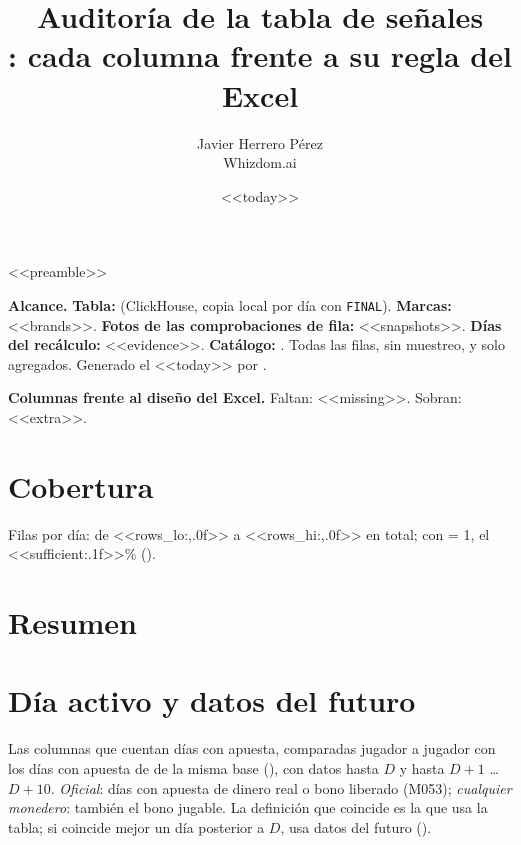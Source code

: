 <<preamble>>
\newcommand{\prioE}{\badge{BrickRed}{ERROR}}
\title{\textbf{Auditoría de la tabla de señales}\\[2pt]\large{}: cada columna frente a su regla del Excel}
\date{<<today>>}
\author{Javier Herrero Pérez \\ Whizdom.ai}


\maketitle
\vspace{-1.2cm}

\textbf{Alcance.} \textbf{Tabla:}  (ClickHouse, copia local por día con \texttt{FINAL}). \textbf{Marcas:} <<brands>>. \textbf{Fotos de las comprobaciones de fila:} <<snapshots>>. \textbf{Días del recálculo:} <<evidence>>. \textbf{Catálogo:} . Todas las filas, sin muestreo, y solo agregados. Generado el <<today>> por .

\textbf{Columnas frente al diseño del Excel.} Faltan: <<missing>>. Sobran: <<extra>>.

\section{Cobertura}
Filas por día: de <<rows_lo:,.0f>> a <<rows_hi:,.0f>> en total; con  = 1, el <<sufficient:.1f>>\% ().

\section{Resumen}
\begin{center}

\end{center}

\section{Día activo y datos del futuro}
Las columnas que cuentan días con apuesta, comparadas jugador a jugador con los días con apuesta de  de la misma base (), con datos hasta $D$ y hasta $D+1$ \ldots $D+10$. \emph{Oficial}: días con apuesta de dinero real o bono liberado (M053); \emph{cualquier monedero}: también el bono jugable. La definición que coincide es la que usa la tabla; si coincide mejor un día posterior a $D$, usa datos del futuro ().

